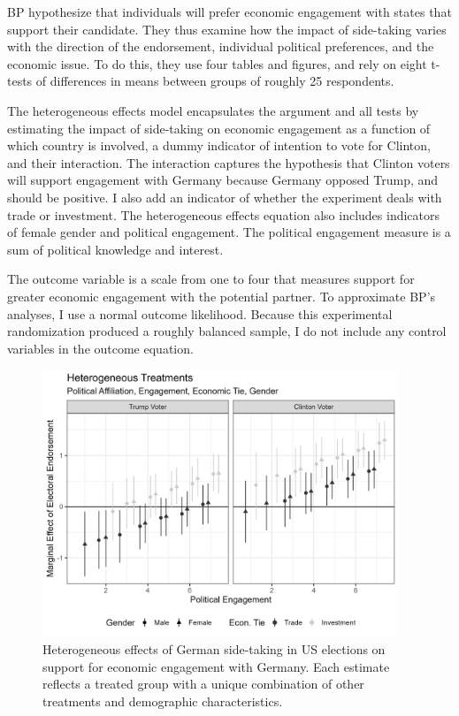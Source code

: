 \documentclass[12pt]{article}
\begin{document}
BP hypothesize that individuals will prefer economic engagement with states that support their candidate. 
They thus examine how the impact of side-taking varies with the direction of the endorsement, individual political preferences, and the economic issue. 
To do this, they use four tables and figures, and rely on eight t-tests of differences in means between groups of roughly 25 respondents. 


The heterogeneous effects model encapsulates the argument and all tests by estimating the impact of side-taking on economic engagement as a function of which country is involved, a dummy indicator of intention to vote for Clinton, and their interaction. 
The interaction captures the hypothesis that Clinton voters will support engagement with Germany because Germany opposed Trump, and should be positive. 
I also add an indicator of whether the experiment deals with trade or investment. 
The heterogeneous effects equation also includes indicators of female gender and political engagement. 
The political engagement measure is a sum of political knowledge and interest. 


The outcome variable is a scale from one to four that measures support for greater economic engagement with the potential partner. 
To approximate BP's analyses, I use a normal outcome likelihood. 
Because this experimental randomization produced a roughly balanced sample, I do not include any control variables in the outcome equation. 


\begin{figure}[htpb]
	\centering
		\includegraphics[width=0.95\textwidth]{bp-het-est.png}
	\caption{Heterogeneous effects of German side-taking in US elections on support for economic engagement with Germany. Each estimate reflects a treated group with a unique combination of other treatments and demographic characteristics.}
	\label{fig:bp-het-est}
\end{figure}
\end{document}
